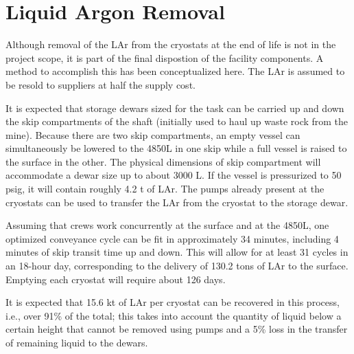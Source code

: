 

\section{Liquid Argon Removal}
\label{sec:liquid-argon-removal}
 
Although removal of the LAr from the cryostats at the end of life is not in the project 
scope, it is part of the final  dispostion of the facility components. A method to 
accomplish this has been conceptualized here. The LAr is assumed to be resold to 
suppliers at half the supply cost.
 
It is expected that storage dewars sized for the task can be carried up and down the skip 
compartments of the shaft (initially used to haul up waste rock from the mine). Because there 
are two skip compartments, an empty vessel can simultaneously be lowered to the 4850L in one 
skip while a full vessel is raised to the surface in the other. The physical dimensions of 
skip compartment will accommodate a dewar size up to about 3000 L. %
If  the vessel is pressurized to 50 psig, it will contain roughly 4.2 t of LAr. The pumps 
already present at the cryostats can be used to transfer the LAr from the cryostat to the 
storage dewar.
 
Assuming that crews work concurrently at the surface and at the 4850L, one 
optimized conveyance cycle can be fit in approximately 34 minutes, including 4 minutes of 
skip transit time up and down. This will allow for at least 31 cycles in an 18-hour day, 
corresponding to the delivery of 130.2 tons of LAr to the surface. Emptying each 
cryostat will require about 126 days.
 
It is expected that 15.6 kt of LAr per cryostat can be recovered in this process, 
i.e., over 91\% of the total; this takes into account the quantity of liquid below a 
certain height that cannot be removed using pumps and a 
5\% loss in the transfer of remaining 
liquid to the dewars.

